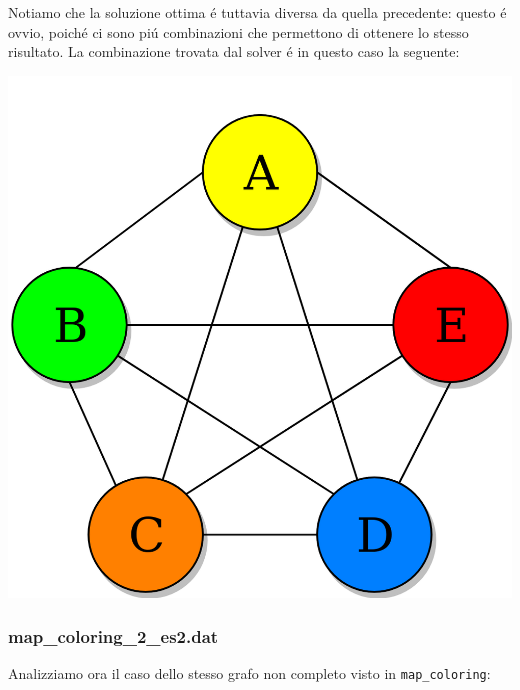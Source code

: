 \documentclass{article}
\begin{document}
Notiamo che la soluzione ottima \'e tuttavia diversa da quella precedente: questo \'e ovvio, poich\'e ci sono pi\'u combinazioni che permettono di ottenere lo stesso risultato. La combinazione trovata dal solver \'e in questo caso la seguente:\\

\begin{center}
\includegraphics[scale=0.2]{complete_graph_coloured2.png}
\end{center}

\subsubsection{map\_coloring\_2\_es2.dat}
Analizziamo ora il caso dello stesso grafo non completo visto in \texttt{map\_coloring}:\\
\end{document}
